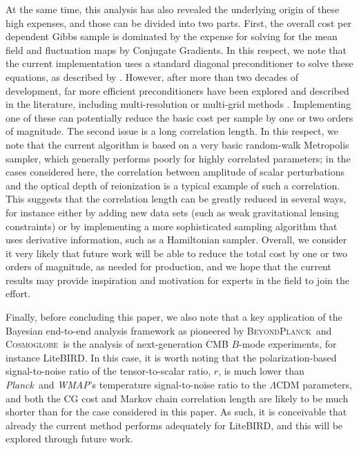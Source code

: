 \documentclass[twocolumn]{../common/aa}
\def\WMAP{\emph{WMAP}}
\def\Planck{\emph{Planck}}
\newcommand{\BP}{\textsc{BeyondPlanck}}
\newcommand{\cosmoglobe}{\textsc{Cosmoglobe}}
\begin{document}
At the same time, this analysis has also revealed the underlying origin of these high expenses, and those can be divided into two parts. First, the overall cost per dependent Gibbs sample is dominated by the expense for solving for the mean field and fluctuation maps by Conjugate Gradients. In this respect, we note that the current implementation uses a standard diagonal preconditioner to solve these equations, as described by \citet{eriksen:2004}. However, after more than two decades of development, far more efficient preconditioners have been explored and described in the literature, including multi-resolution or multi-grid methods \citep[e.g.,][]{seljebotn:2013,seljebotn:2019}. Implementing one of these can potentially reduce the basic cost per sample by one or two orders of magnitude. The second issue is a long correlation length. In this respect, we note that the current algorithm is based on a very basic random-walk Metropolis sampler, which generally performs poorly for highly correlated parameters; in the cases considered here, the correlation between amplitude of scalar perturbations and the optical depth of reionization is a typical example of such a correlation. This suggests that the correlation length can be greatly reduced in several ways, for instance either by adding new data sets (such as weak gravitational lensing constraints) or by implementing a more sophisticated sampling algorithm that uses derivative information, such as a Hamiltonian sampler. Overall, we consider it very likely that future work will be able to reduce the total cost by one or two orders of magnitude, as needed for production, and we hope that the current results may provide inspiration and motivation for experts in the field to join the effort.

Finally, before concluding this paper, we also note that a key application of the Bayesian end-to-end analysis framework as pioneered by \BP\ and \cosmoglobe\ is the analysis of next-generation CMB $B$-mode experiments, for instance LiteBIRD. In this case, it is worth noting that the polarization-based signal-to-noise ratio of the tensor-to-scalar ratio, $r$, is much lower than \Planck\ and \WMAP's temperature signal-to-noise ratio to the $\Lambda$CDM parameters, and both the CG cost and Markov chain correlation length are likely to be much shorter than for the case considered in this paper. As such, it is conceivable that already the current method performs adequately for LiteBIRD, and this will be explored through future work.



\end{document}
